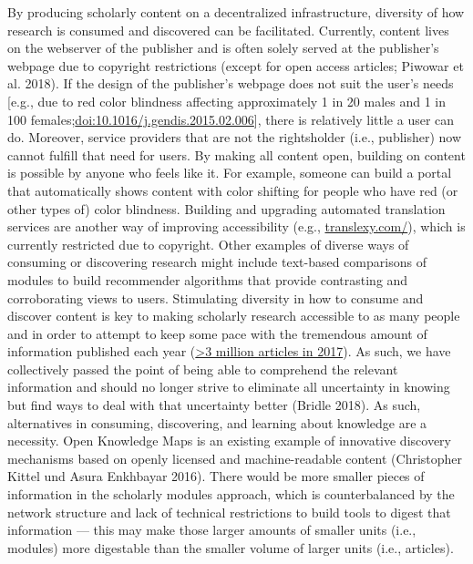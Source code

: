 \documentclass[a4paper]{article}
\begin{document}
By producing scholarly content on a decentralized infrastructure,
diversity of how research is consumed and discovered can be facilitated.
Currently, content lives on the webserver of the publisher and is often
solely served at the publisher's webpage due to copyright restrictions
(except for open access articles; Piwowar et al. 2018). If the design of
the publisher's webpage does not suit the user's needs {[}e.g., due to
red color blindness affecting approximately 1 in 20 males and 1 in 100
females;\url{doi:10.1016/j.gendis.2015.02.006}{]}, there is relatively
little a user can do. Moreover, service providers that are not the
rightsholder (i.e., publisher) now cannot fulfill that need for users.
By making all content open, building on content is possible by anyone
who feels like it. For example, someone can build a portal that
automatically shows content with color shifting for people who have red
(or other types of) color blindness. Building and upgrading automated
translation services are another way of improving accessibility (e.g.,
\href{http://translexy.com/}{translexy.com/}), which is currently
restricted due to copyright. Other examples of diverse ways of consuming
or discovering research might include text-based comparisons of modules
to build recommender algorithms that provide contrasting and
corroborating views to users. Stimulating diversity in how to consume
and discover content is key to making scholarly research accessible to
as many people and in order to attempt to keep some pace with the
tremendous amount of information published each year
(\href{https://api.crossref.org/works?filter=type:journal-article,from-pub-date:2017,until-pub-date:2017\&rows=0}{\textgreater{}3
million articles in 2017}). As such, we have collectively passed the
point of being able to comprehend the relevant information and should no
longer strive to eliminate all uncertainty in knowing but find ways to
deal with that uncertainty better (Bridle 2018). As such, alternatives
in consuming, discovering, and learning about knowledge are a necessity.
Open Knowledge Maps is an existing example of innovative discovery
mechanisms based on openly licensed and machine-readable content
(Christopher Kittel und Asura Enkhbayar 2016). There would be more
smaller pieces of information in the scholarly modules approach, which
is counterbalanced by the network structure and lack of technical
restrictions to build tools to digest that information --- this may make
those larger amounts of smaller units (i.e., modules) more digestable
than the smaller volume of larger units (i.e., articles).
\end{document}
